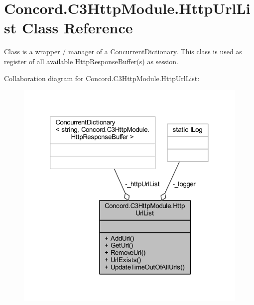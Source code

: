 \hypertarget{class_concord_1_1_c3_http_module_1_1_http_url_list}{}\section{Concord.\+C3\+Http\+Module.\+Http\+Url\+List Class Reference}
\label{class_concord_1_1_c3_http_module_1_1_http_url_list}


Class is a wrapper / manager of a Concurrent\+Dictionary. This class is used as register of all available Http\+Response\+Buffer(s) as session.  




Collaboration diagram for Concord.\+C3\+Http\+Module.\+Http\+Url\+List\+:
\nopagebreak
\begin{figure}[H]
\begin{center}
\leavevmode
\includegraphics[width=320pt]{class_concord_1_1_c3_http_module_1_1_http_url_list__coll__graph}
\end{center}
\end{figure}
